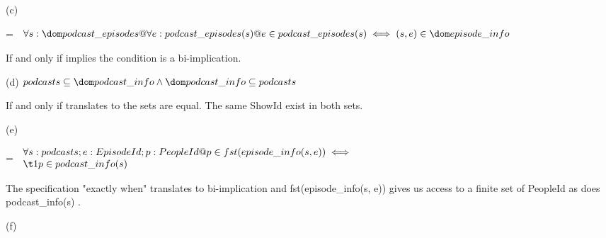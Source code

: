 \documentclass[a4paper,10pt,fleqn]{article}
\begin{document}
\noindent\hspace*{\parindent}(c)

\setlength{\leftskip}{\dimexpr\parindent+2em\relax}
\savedleftskip=\leftskip
\noindent
$\displaystyle
\begin{array}{l}
\forall s : \dom podcast\_episodes @ \forall e : podcast\_episodes(s) @ e \in podcast\_episodes(s) \iff (s, e) \in \dom episode\_info
\end{array}$

\bigskip


\bigskip

\setlength{\leftskip}{\dimexpr\parindent+2em\relax}
\noindent If and only if implies the condition is a bi-implication.

\bigskip

\newpage

\setlength{\leftskip}{0pt}
\medskip

\noindent\hspace*{\parindent}(d) $podcasts \subseteq \dom podcast\_info \land \dom podcast\_info \subseteq podcasts$

\bigskip

\setlength{\leftskip}{\dimexpr\parindent+2em\relax}
\noindent If and only if translates to the sets are equal. The same ShowId exist in both sets.

\bigskip

\setlength{\leftskip}{0pt}
\medskip

\noindent\hspace*{\parindent}(e)

\setlength{\leftskip}{\dimexpr\parindent+2em\relax}
\savedleftskip=\leftskip
\noindent
$\displaystyle
\begin{array}{l}
\forall s : podcasts; e : EpisodeId; p : PeopleId @ p \in fst(episode\_info(s, e)) \iff \\
\t1 p \in podcast\_info(s)
\end{array}$

\bigskip


\bigskip

\setlength{\leftskip}{\dimexpr\parindent+2em\relax}
\noindent The specification "exactly when" translates to bi-implication and fst(episode\_info(s, e)) gives us access to a finite set of PeopleId as does podcast\_info(s) .

\bigskip

\setlength{\leftskip}{0pt}
\medskip

\noindent\hspace*{\parindent}(f)
\end{document}
